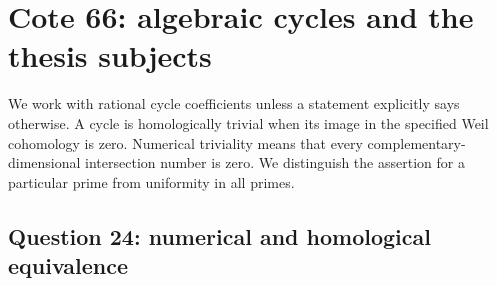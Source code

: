 \section{Cote 66: algebraic cycles and the thesis subjects}
\label{sec:B}

We work with rational cycle coefficients unless a statement explicitly says otherwise. A cycle is homologically trivial when its image in the specified Weil cohomology is zero. Numerical triviality means that every complementary-dimensional intersection number is zero. We distinguish the assertion for a particular prime from uniformity in all primes.

\subsection{Question 24: numerical and homological equivalence}


